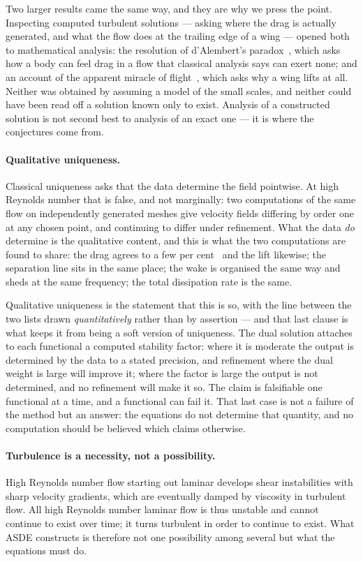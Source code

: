 \documentclass[11pt]{article}
\begin{document}
Two larger results came the same way, and they are why we press the point. Inspecting computed
turbulent solutions --- asking where the drag is actually generated, and what the flow does at the
trailing edge of a wing --- opened both to mathematical analysis: the resolution of d'Alembert's
paradox~\cite{dalembert}, which asks how a body can feel drag in a flow that classical analysis says
can exert none; and an account of the apparent miracle of flight~\cite{flight}, which asks why a wing
lifts at all. Neither was obtained by assuming a model of the small scales, and neither could have
been read off a solution known only to exist. Analysis of a constructed solution is not second best to
analysis of an exact one --- it is where the conjectures come from.

\paragraph{Qualitative uniqueness.} Classical uniqueness asks that the data determine the field
pointwise. At high Reynolds number that is false, and not marginally: two computations of the same
flow on independently generated meshes give velocity fields differing by order one at any chosen
point, and continuing to differ under refinement. What the data \emph{do} determine is the
qualitative content, and this is what the two computations are found to share: the drag agrees to a
few per cent~\cite{drag} and the lift likewise; the separation line sits in the same place; the wake
is organised the same way and sheds at the same frequency; the total dissipation rate is the same.

Qualitative uniqueness is the statement that this is so, with the line between the two lists drawn
\emph{quantitatively} rather than by assertion --- and that last clause is what keeps it from being
a soft version of uniqueness. The dual solution attaches to each functional a computed stability
factor: where it is moderate the output is determined by the data to a stated precision, and
refinement where the dual weight is large will improve it; where the factor is large the output is
not determined, and no refinement will make it so. The claim is falsifiable one functional at a
time, and a functional can fail it. That last case is not a failure of the method but an answer:
the equations do not determine that quantity, and no computation should be believed which claims
otherwise.

\paragraph{Turbulence is a necessity, not a possibility.} High Reynolds number flow starting out
laminar develops shear instabilities with sharp velocity gradients, which are eventually damped by
viscosity in turbulent flow. All high Reynolds number laminar flow is thus unstable and cannot
continue to exist over time; it turns turbulent in order to continue to exist. What ASDE constructs
is therefore not one possibility among several but what the equations must do.
\end{document}
